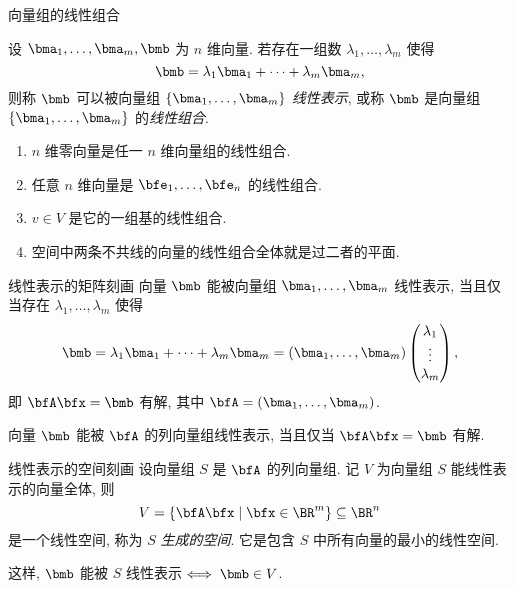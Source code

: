\begin{frame}{向量组的线性组合}
	\onslide<+->
	\begin{definition}
		设 $\bma_1,\dots,\bma_m,\bmb$ 为 $n$ 维向量.
		若存在一组数 $\lambda_1,\dots,\lambda_m$ 使得
		\[\bmb=\lambda_1\bma_1+\cdots+\lambda_m\bma_m,\]
		则称 $\bmb$ 可以被向量组 $\{\bma_1,\dots,\bma_m\}$ \emph{线性表示}, 或称 $\bmb$ 是向量组 $\{\bma_1,\dots,\bma_m\}$ 的\emph{线性组合}.
	\end{definition}
	\onslide<+->
	\begin{example}
		\begin{enumerate}
			\item $n$ 维零向量是任一 $n$ 维向量组的线性组合.
			\item 任意 $n$ 维向量是 $\bfe_1,\dots,\bfe_n$ 的线性组合.
			\item $v\in V$ 是它的一组基的线性组合.
			\item 空间中两条不共线的向量的线性组合全体就是过二者的平面.
		\end{enumerate}
	\end{example}
\end{frame}


\begin{frame}{线性表示的矩阵刻画}
	\onslide<+->
	向量 $\bmb$ 能被向量组 $\bma_1,\dots,\bma_m$ 线性表示, 
	\onslide<+->
	当且仅当存在 $\lambda_1,\dots,\lambda_m$ 使得
	\[\bmb=\lambda_1\bma_1+\cdots+\lambda_m\bma_m=(\bma_1,\dots,\bma_m)\begin{pmatrix}
		\lambda_1\\\vdots\\\lambda_m
	\end{pmatrix},\]
	\onslide<+->
	即 $\bfA\bfx=\bmb$ 有解, 其中 $\bfA=(\bma_1,\dots,\bma_m)$.
	\onslide<+->
	\begin{theorem}
		向量 $\bmb$ 能被 $\bfA$ 的列向量组线性表示, 当且仅当 $\bfA\bfx=\bmb$ 有解.
	\end{theorem}
\end{frame}


\begin{frame}{线性表示的空间刻画}
	\onslide<+->
	设向量组 $S$ 是 $\bfA$ 的列向量组.
	\onslide<+->
	记 $V$ 为向量组 $S$ 能线性表示的向量全体,
	\onslide<+->
	则
	\[V=\{\bfA\bfx\mid \bfx\in\BR^m\}\subseteq \BR^n\]
	是一个线性空间, 称为 $S$ \emph{生成的空间}.
	\onslide<+->
	它是包含 $S$ 中所有向量的最小的线性空间.

	\onslide<+->
	这样, $\bmb$ 能被 $S$ 线性表示$\iff \bmb\in V$.
\end{frame}


